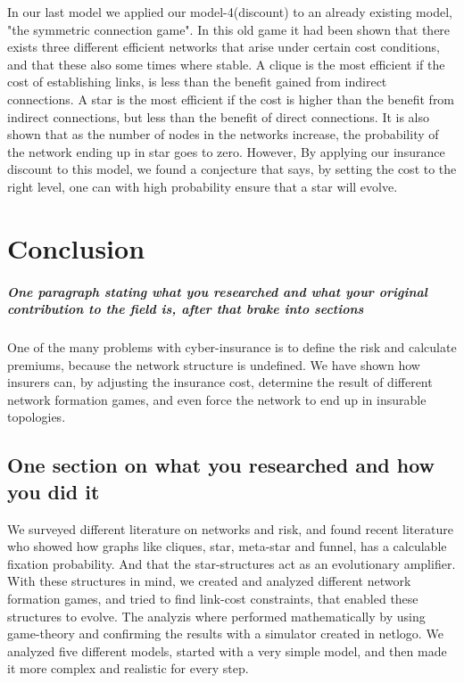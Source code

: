 In our last model we applied our model-4(discount) to an already existing model, "the symmetric connection game". In this old game it had been shown that there exists three different efficient networks that arise under certain cost conditions, and that these also some times where stable. A clique is the most efficient if the cost of establishing links, is less than the benefit gained from indirect connections. A star is the most efficient if the cost is higher than the benefit from indirect connections, but less than the benefit of direct connections. 
It is also shown that as the number of nodes in the networks increase, the probability of the network ending up in star goes to zero. However, By applying our insurance discount to this model, we found a conjecture that says, by setting the cost to the right level, one can with high probability ensure that a star will evolve. 

\section{Conclusion}
\subparagraph{One paragraph stating what you researched and what your original contribution to the field is, after that brake into sections}
One of the many problems with cyber-insurance is to define the risk and calculate premiums, because the network structure is undefined. We have shown how insurers can, by adjusting the insurance cost, determine the result of different network formation games, and even force the network to end up in insurable topologies.  
\subsection{One section on what you researched and how you did it}
We surveyed different literature on networks and risk, and found recent literature who showed how graphs like cliques, star, meta-star and funnel, has a calculable fixation probability. And that the star-structures act as an evolutionary amplifier. 
With these structures in mind, we created and analyzed different network formation games, and tried to find link-cost constraints, that enabled these structures to evolve. 
The analyzis where performed mathematically by using game-theory and confirming the results with a simulator created in netlogo.
We analyzed five different models, started with a very simple model, and then made it more complex and realistic for every step. 
